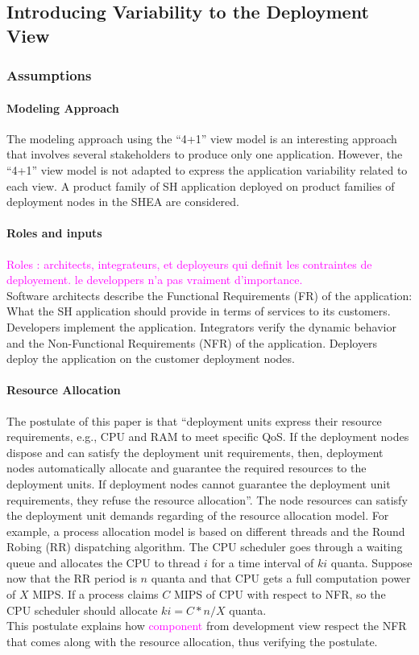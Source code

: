 \documentclass{llncs}
\begin{document}
\subsection{Introducing Variability to the Deployment View}
\subsubsection{Assumptions}
\paragraph{Modeling Approach}The modeling approach using the ``4+1'' view model is an interesting approach that involves several stakeholders to produce only one application. However, the ``4+1'' view model is not adapted to express the application variability related to each view. A product family of SH application deployed on product families of deployment nodes in the SHEA are considered. %
\paragraph{Roles and inputs}
\textcolor{magenta}{Roles : architects, integrateurs, et deployeurs qui definit les contraintes de deployement. le developpers n'a pas vraiment d'importance.}\\
Software architects describe the Functional Requirements (FR) of the application: What the SH application should provide in terms of services to its customers. Developers implement the application. Integrators verify the dynamic behavior and the Non-Functional Requirements (NFR) of the application. Deployers deploy the application on the customer deployment nodes.
\paragraph{Resource Allocation}
The postulate of this paper is that ``deployment units express their resource requirements, e.g., CPU and RAM to meet specific QoS. If the deployment nodes dispose and can satisfy the deployment unit requirements, then, deployment nodes automatically allocate and guarantee the required resources to the deployment units. If deployment nodes cannot guarantee the deployment unit requirements, they refuse the resource allocation''. The node resources can satisfy the deployment unit demands regarding of the resource allocation model. For example, a process allocation model is based on different threads and the Round Robing (RR) dispatching algorithm. The CPU scheduler goes through a waiting queue and allocates the CPU to thread $i$ for a time interval of $ki$ quanta. Suppose now that the RR period is $n$ quanta and that CPU gets a full computation power of $X$ MIPS.  If a process claims $C$ MIPS of CPU with respect to NFR, so the CPU scheduler should allocate $ki = C*n/X$ quanta.\\ This postulate explains how \textcolor{magenta}{component} from development view respect the NFR that comes along with the resource allocation, thus verifying the postulate.
\end{document}
